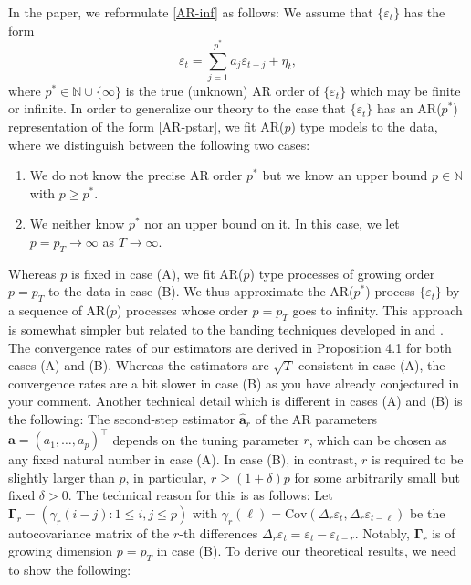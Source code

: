 \documentclass[a4paper,12pt]{article}
\begin{document}
\begin{enumerate}[label=(\arabic*),leftmargin=0.7cm]
In the paper, we reformulate \eqref{AR-inf} as follows: We assume that $\{\varepsilon_t\}$ has the form
\begin{equation}\label{AR-pstar}
\varepsilon_t = \sum\limits_{j=1}^{p^*} a_j \varepsilon_{t-j} + \eta_t, \tag{$**$} 
\end{equation}
where $p^* \in \mathbb{N} \cup \{\infty\}$ is the true (unknown) AR order of $\{\varepsilon_t\}$ which may be finite or infinite. In order to generalize our theory to the case that $\{\varepsilon_t\}$ has an AR($p^*$) representation of the form \eqref{AR-pstar}, we fit AR($p$) type models to the data, where we distinguish between the following two cases: 
\begin{enumerate}[label=(\Alph*),leftmargin=0.8cm]
\item We do not know the precise AR order $p^*$ but we know an upper bound $p \in \mathbb{N}$ with $p \ge p^*$. 
\item We neither know $p^*$ nor an upper bound on it. In this case, we let $p=p_T \rightarrow \infty$ as $T \rightarrow \infty$. 
\end{enumerate}
Whereas $p$ is fixed in case (A), we fit AR($p$) type processes of growing order $p = p_T$ to the data in case (B). We thus approximate the AR($p^*$) process $\{ \varepsilon_t \}$ by a sequence of AR($p$) processes whose order $p = p_T$ goes to infinity. This approach is somewhat simpler but related to the banding techniques developed in \cite{WuPourahmadi2009} and \cite{XiaoWu2012}. \newline
%
The convergence rates of our estimators are derived in Proposition 4.1 for both cases (A) and (B). Whereas the estimators are $\sqrt{T}$-consistent in case (A), the convergence rates are a bit slower in case (B) as you have already conjectured in your comment. Another technical detail which is different in cases (A) and (B) is the following: The second-step estimator $\widehat{\boldsymbol{a}}_r$ of the AR parameters $\boldsymbol{a} = (a_1,\ldots,a_p)^\top$ depends on the tuning parameter $r$, which can be chosen as any fixed natural number in case (A). In case (B), in contrast, $r$ is required to be slightly larger than $p$, in particular, $r \ge (1+\delta)p$ for some arbitrarily small but fixed $\delta > 0$. The technical reason for this is as follows: Let $\boldsymbol{\Gamma}_r = (\gamma_r(i-j): 1 \le i,j \le p)$ with $\gamma_r(\ell) = \text{Cov}(\Delta_r \varepsilon_t,\Delta_r \varepsilon_{t-\ell})$ be the autocovariance matrix of the $r$-th differences $\Delta_r \varepsilon_t = \varepsilon_t - \varepsilon_{t-r}$. Notably, $\boldsymbol{\Gamma}_r$ is of growing dimension $p=p_T$ in case (B). To derive our theoretical results, we need to show the following:  

\end{enumerate}
\end{document}

